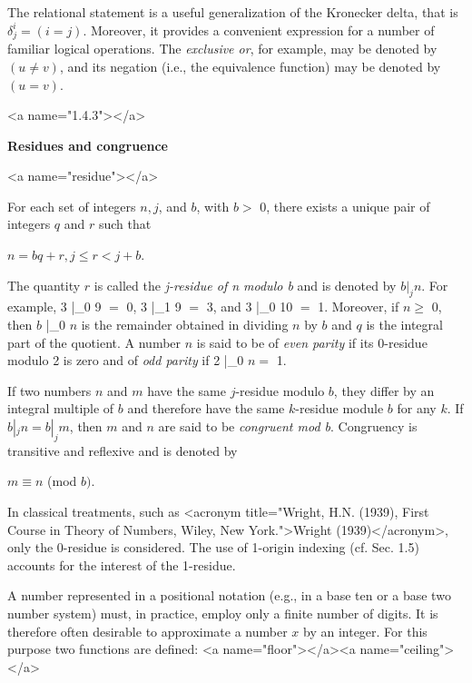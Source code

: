 \par The relational statement is a useful generalization of the Kronecker delta, that is $δ_j^i = (i = j)$. Moreover, it provides a convenient expression for a number of familiar logical operations. The \textit{exclusive or}, for example, may be denoted by $(u \neq v)$, and its negation (i.e., the equivalence function) may be denoted by $(u = v)$.

<a name="1.4.3"></a>
\par \textbf{Residues and congruence}

<a name="residue"></a>
\par For each set of integers $n, j$, and $b$, with $b >$ 0, there exists a unique pair of integers $q$ and $r$ such that

\par $n = bq + r, j \leq r < j + b$.

\par The quantity $r$ is called the \textit{j-residue of n modulo b} and is denoted by $b |_j n$. For example, 3 |_0 9 $=$ 0, 3 |_1 9 $=$ 3, and 3 |_0 10 $=$ 1. Moreover, if $n \geq$ 0, then $b$ |_0 $n$ is the remainder obtained in dividing $n$ by $b$ and $q$ is the integral part of the quotient. A number $n$ is said to be of \textit{even parity} if its 0-residue modulo 2 is zero and of \textit{odd parity} if 2 |_0 $n =$ 1.

\par If two numbers $n$ and $m$ have the same $j$-residue modulo $b$, they differ by an integral multiple of $b$ and therefore have the same $k$-residue module $b$ for any $k$. If $b |_j n = b |_j m$, then $m$ and $n$ are said to be \textit{congruent mod b}. Congruency is transitive and reflexive and is denoted by

\par $m \equiv n$ (mod $b)$.

\par In classical treatments, such as
<acronym title="Wright, H.N. (1939), First Course in Theory of Numbers, Wiley, New York.">Wright (1939)</acronym>, only the 0-residue is considered. The use of 1-origin indexing (cf. Sec. 1.5) accounts for the interest of the 1-residue.

\par A number represented in a positional notation (e.g., in a base ten or a base two number system) must, in practice, employ only a finite number of digits. It is therefore often desirable to approximate a number $x$ by an integer. For this purpose two functions are defined:
<a name="floor"></a><a name="ceiling"></a>

